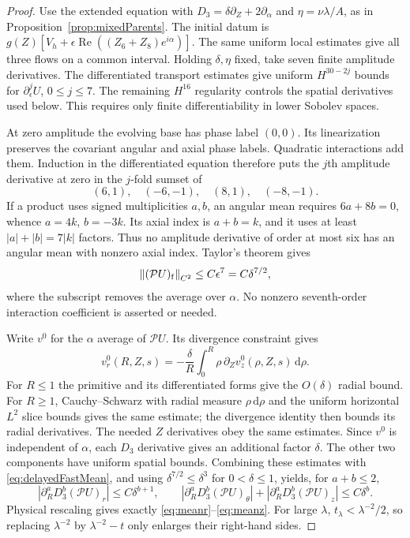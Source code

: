 \documentclass[11pt]{article}
\theoremstyle{remark}
\newcommand{\PP}{\mathcal P}
\newcommand{\dd}{\,\mathrm d}
\newcommand{\norm}[1]{\left\lVert#1\right\rVert}
\begin{document}
\begin{proof}
Use the extended equation with
$D_3=\delta\partial_Z+2\partial_\alpha$ and $\eta=\nu\lambda/A$,
as in Proposition~\ref{prop:mixedParents}. The initial datum is
$g(Z)[V_h+\epsilon\operatorname{Re}((Z_6+Z_8)e^{i\alpha})]$.
The same uniform local estimates give all three flows on a common
interval. Holding $\delta,\eta$ fixed, take seven finite amplitude
derivatives. The differentiated transport estimates give uniform
$H^{30-2j}$ bounds for $\partial_\epsilon^j U$, $0\leq j\leq7$.
The remaining $H^{16}$ regularity controls the spatial derivatives
used below. This requires only finite differentiability in lower
Sobolev spaces.

At zero amplitude the evolving base has phase label $(0,0)$.
Its linearization preserves the covariant angular and axial phase
labels. Quadratic interactions add them. Induction in the differentiated
equation therefore puts the $j$th amplitude derivative at zero in
the $j$-fold sumset of
\[
 (6,1),\quad(-6,-1),\quad(8,1),\quad(-8,-1).
\]
If a product uses signed multiplicities $a,b$, an angular mean
requires $6a+8b=0$, whence $a=4k$, $b=-3k$. Its axial index is
$a+b=k$, and it uses at least $|a|+|b|=7|k|$ factors.
Thus no amplitude derivative of order at most six has an angular
mean with nonzero axial index. Taylor's theorem gives
\begin{equation}\label{eq:delayedFastMean}
 \norm{(\PP U)_{\rm f}}_{C^2}\leq C\epsilon^7
                                      =C\delta^{7/2},
\end{equation}
where the subscript removes the average over $\alpha$.
No nonzero seventh-order interaction coefficient is asserted or needed.

Write $v^0$ for the $\alpha$ average of $\PP U$.
Its divergence constraint gives
\[
 v^0_r(R,Z,s)=-\frac\delta R
           \int_0^R\rho\,\partial_Zv^0_z(\rho,Z,s)\dd\rho.
\]
For $R\leq1$ the primitive and its differentiated forms give the
$O(\delta)$ radial bound. For $R\geq1$, Cauchy--Schwarz with radial
measure $\rho\dd\rho$ and the uniform horizontal $L^2$ slice bounds
gives the same estimate; the divergence identity then bounds its
radial derivatives. The needed $Z$ derivatives obey the same estimates.
Since $v^0$ is independent of $\alpha$, each $D_3$ derivative gives
an additional factor $\delta$. The other two components have uniform
spatial bounds. Combining these estimates with
\eqref{eq:delayedFastMean}, and using $\delta^{7/2}\leq\delta^3$
for $0<\delta\leq1$, yields, for $a+b\leq2$,
\[
 |\partial_R^aD_3^b(\PP U)_r|\leq C\delta^{b+1},\qquad
 |\partial_R^aD_3^b(\PP U)_\theta|
       +|\partial_R^aD_3^b(\PP U)_z|\leq C\delta^b.
\]
Physical rescaling gives exactly
\eqref{eq:meanr}--\eqref{eq:meanz}. For large $\lambda$,
$t_\lambda<\lambda^{-2}/2$, so replacing $\lambda^{-2}$ by
$\lambda^{-2}-t$ only enlarges their right-hand sides.


\end{proof}
\end{document}
